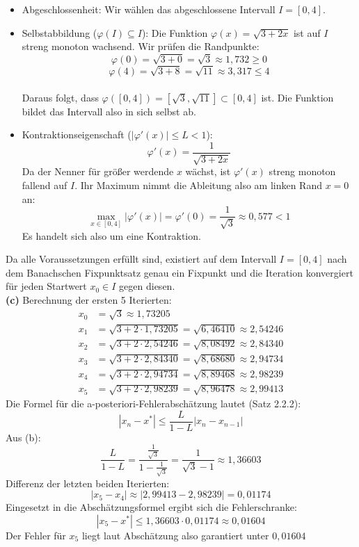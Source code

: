 \documentclass[a4paper,12pt]{article}
\begin{document}
\begin{itemize}
\item Abgeschlossenheit: Wir wählen das abgeschlossene Intervall $I = [0, 4].$
\item Selbstabbildung ($\varphi(I) \subseteq I$):
Die Funktion $\varphi(x) = \sqrt{3 + 2x}$ ist auf $I$ streng monoton wachsend.
Wir prüfen die Randpunkte:\\
$$\varphi(0) = \sqrt{3 + 0} = \sqrt{3} \approx 1{,}732 \ge 0$$ 
$$\varphi(4) = \sqrt{3 + 8} = \sqrt{11} \approx 3{,}317 \le 4$$\\
Daraus folgt, dass $\varphi([0, 4]) = [\sqrt{3}, \sqrt{11}] \subset [0, 4]$ ist. Die Funktion bildet das Intervall also in sich selbst ab. 
\item Kontraktionseigenschaft ($|\varphi'(x)| \le L < 1$):
$$\varphi'(x) =  \frac{1}{\sqrt{3 + 2x}}$$
Da der Nenner für größer werdende $x$ wächst, ist $\varphi'(x)$ streng monoton fallend auf $I$. Ihr Maximum nimmt die Ableitung also am linken Rand $x = 0$ an:$$\max_{x \in [0, 4]} |\varphi'(x)| = \varphi'(0) = \frac{1}{\sqrt{3}} \approx 0{,}577<1$$
Es handelt sich also um eine Kontraktion.

\end{itemize}
Da alle Voraussetzungen erfüllt sind, existiert auf dem Intervall $I = [0, 4]$ nach dem Banachschen Fixpunktsatz genau ein Fixpunkt und die Iteration konvergiert für jeden Startwert $x_0 \in I$ gegen diesen.\\


\bigskip
\noindent\textbf{(c)} Berechnung der ersten 5 Iterierten: \\
\begin{align*}
x_0 &= \sqrt{3} \approx 1{,}73205\\
x_1 &= \sqrt{3 + 2 \cdot 1{,}73205} = \sqrt{6{,}46410} \approx 2{,}54246\\
x_2 &= \sqrt{3 + 2 \cdot 2{,}54246} = \sqrt{8{,}08492} \approx 2{,}84340\\
x_3 &= \sqrt{3 + 2 \cdot 2{,}84340} = \sqrt{8{,}68680} \approx 2{,}94734\\
x_4 &= \sqrt{3 + 2 \cdot 2{,}94734} = \sqrt{8{,}89468} \approx 2{,}98239\\
x_5 &= \sqrt{3 + 2 \cdot 2{,}98239} = \sqrt{8{,}96478} \approx 2{,}99413 
\end{align*}
Die Formel für die a-posteriori-Fehlerabschätzung lautet (Satz 2.2.2):
$$|x_n - x^*| \le \frac{L}{1-L} |x_n - x_{n-1}|$$
Aus (b):
$$\frac{L}{1-L} = \frac{\frac{1}{\sqrt{3}}}{1 - \frac{1}{\sqrt{3}}} = \frac{1}{\sqrt{3}-1} \approx 1{,}36603$$
Differenz der letzten beiden Iterierten:$$|x_5 - x_4| \approx |2{,}99413 - 2{,}98239| = 0{,}01174$$
Eingesetzt in die Abschätzungsformel ergibt sich die Fehlerschranke:$$|x_5 - x^*| \le 1{,}36603 \cdot 0{,}01174 \approx 0{,}01604$$Der Fehler für $x_5$ liegt laut Abschätzung also garantiert unter $0{,}01604$
\end{document}
